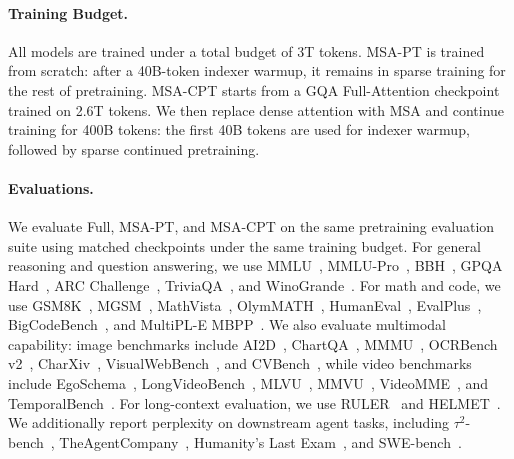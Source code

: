 \documentclass{llmxive}
\providecommand{\method}{\textsc{MSA}}
\begin{document}
\paragraph{Training Budget.} All models are trained under a total budget of 3T tokens. \method{}-PT is trained from scratch: after a 40B-token indexer warmup, it remains in sparse training for the rest of pretraining. \method{}-CPT starts from a GQA Full-Attention checkpoint trained on 2.6T tokens. We then replace dense attention with \method{} and continue training for 400B tokens: the first 40B tokens are used for indexer warmup, followed by sparse continued pretraining.

\paragraph{Evaluations.} We evaluate Full, \method{}-PT, and \method{}-CPT on the same pretraining evaluation suite using matched checkpoints under the same training budget. For general reasoning and question answering, we use MMLU~\citep{hendrycks2021measuring}, MMLU-Pro~\citep{NEURIPS2024_ad236edc}, BBH~\citep{suzgun2022challengingbigbenchtaskschainofthought}, GPQA Hard~\citep{rein2023gpqa}, ARC Challenge~\citep{clark2018thinksolvedquestionanswering}, TriviaQA~\citep{joshi-etal-2017-triviaqa}, and WinoGrande~\citep{Sakaguchi_2020}. For math and code, we use GSM8K~\citep{cobbe2021trainingverifierssolvemath}, MGSM~\citep{shi2022languagemodelsmultilingualchainofthought}, MathVista~\citep{lu2024mathvista}, OlymMATH~\citep{sun2025olymmath}, HumanEval~\citep{chen2021evaluatinglargelanguagemodels}, EvalPlus~\citep{NEURIPS2023_43e9d647}, BigCodeBench~\citep{zhuo2025bigcodebench}, and MultiPL-E MBPP~\citep{cassano2023multipl}. We also evaluate multimodal capability: image benchmarks include AI2D~\citep{kembhavi2016ai2d}, ChartQA~\citep{masry-etal-2022-chartqa}, MMMU~\citep{yue2024mmmu}, OCRBench v2~\citep{fu2025ocrbenchv2improvedbenchmark}, CharXiv~\citep{wang2024charxiv}, VisualWebBench~\citep{liu2024visualwebbench}, and CVBench~\citep{NEURIPS2024_9ee3a664}, while video benchmarks include EgoSchema~\citep{mangalam2023egoschema}, LongVideoBench~\citep{NEURIPS2024_329ad516}, MLVU~\citep{Zhou_2025_CVPR}, MMVU~\citep{zhao2025mmvu}, VideoMME~\citep{fu2024videomme}, and TemporalBench~\citep{cai2024temporalbenchbenchmarkingfinegrainedtemporal}. For long-context evaluation, we use RULER~\citep{hsieh2024ruler} and HELMET~\citep{yen2025helmet}. We additionally report perplexity on downstream agent tasks, including $\tau^2$-bench~\citep{barres2025tau2}, TheAgentCompany~\citep{xu2024theagentcompany}, Humanity's Last Exam~\citep{phan2025hle}, and SWE-bench~\citep{jimenez2024swebench}.
\end{document}
